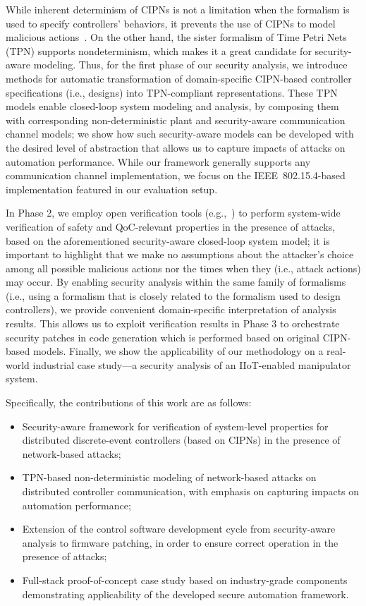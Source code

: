 While inherent determinism of CIPNs is not a limitation when the formalism is used to specify controllers' behaviors, it prevents the use of CIPNs to model malicious actions~\cite{wang_arxiv19}. On the other hand, the sister formalism of Time Petri Nets (TPN) supports nondeterminism, which makes it a great candidate for security-aware modeling.
Thus, for the first phase of our security analysis, we introduce methods for
automatic transformation of domain-specific CIPN-based controller specifications (i.e., designs) into TPN-compliant representations. These TPN models enable closed-loop system modeling and analysis, by composing them with corresponding non-deterministic plant and security-aware communication channel models; we show how such security-aware models can be developed with the desired level of abstraction that allows us to capture impacts of attacks on automation performance. While our framework generally supports any communication channel implementation, we focus on the IEEE~802.15.4-based implementation featured in our evaluation setup.

In Phase 2, we employ open verification tools (e.g.,~\cite{romeo}) to perform system-wide verification of safety and QoC-relevant properties in the presence of attacks, based on the aforementioned security-aware closed-loop system model; it is important to highlight that we make no assumptions about the attacker's choice among all possible malicious actions nor the times when they (i.e., attack actions) may occur.
%
By enabling security analysis within the same family of formalisms (i.e., using a formalism that is closely related to the formalism used to design controllers),   we provide convenient domain-specific interpretation of analysis results. This allows us to exploit verification results in Phase 3 to orchestrate security patches in code generation which is performed based on original CIPN-based models.
%
Finally, we show the applicability of our methodology on a real-world industrial case study---a security analysis of an IIoT-enabled manipulator system. %

{
Specifically, the contributions of this work are as follows:
\begin{itemize}
  \item Security-aware framework for verification of system-level properties for distributed discrete-event controllers (based on CIPNs) in the presence of network-based attacks;
  \item TPN-based non-deterministic modeling of network-based attacks on distributed controller communication, with emphasis on capturing impacts on automation performance;
  \item Extension of the control software development cycle from security-aware analysis to firmware patching, in order to ensure correct operation in the presence of attacks;
  \item Full-stack proof-of-concept case study based on industry-grade components demonstrating applicability of the developed secure automation framework.
\end{itemize}
}

